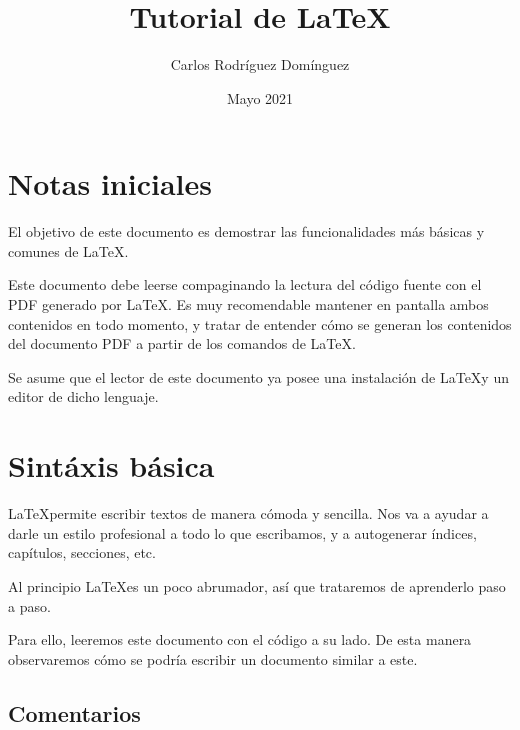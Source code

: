 \documentclass[12pt]{book} %
\title{Tutorial de \LaTeX}
\author{Carlos Rodríguez Domínguez}
\date{Mayo 2021}
\begin{document}
\frontmatter %
\maketitle %
\tableofcontents %

\chapter*{Notas iniciales}

El objetivo de este documento es demostrar las funcionalidades más básicas y comunes de \LaTeX.

Este documento debe leerse compaginando la lectura del código fuente con el PDF generado por \LaTeX. Es muy recomendable mantener en pantalla ambos contenidos en todo momento, y tratar de entender  cómo se generan los contenidos del documento PDF a partir de los comandos de \LaTeX.

Se asume que el lector de este documento ya posee una instalación de \LaTeX y un editor de dicho lenguaje.

\mainmatter %

\chapter{Sintáxis básica}

\LaTeX permite escribir textos de manera cómoda y sencilla.  Nos va a ayudar a darle un estilo profesional a todo lo que escribamos, y a autogenerar índices,  capítulos,  secciones, etc.

Al principio \LaTeX es un poco abrumador, así que trataremos de aprenderlo paso a paso.

Para ello, leeremos este documento con el código a su lado. De esta manera observaremos cómo se podría escribir un documento similar a este.

\section{Comentarios} %
\end{document}
